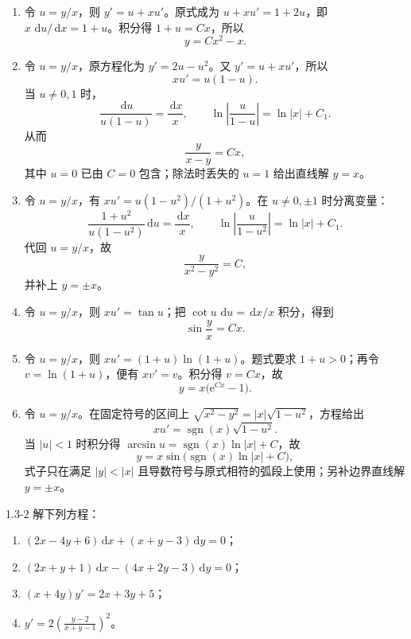 \documentclass[UTF8,a4paper,11pt]{ctexart}
\newcommand{\dd}{\,\mathrm d}
\newcommand{\e}{\mathrm e}
\begin{document}
\begin{solution}
\begin{enumerate}[label=(\arabic*)]
\item 令 $u=y/x$，则 $y'=u+xu'$。原式成为 $u+xu'=1+2u$，即
$x\,\dd u/\dd x=1+u$。积分得 $1+u=Cx$，所以
\[
\boxed{y=Cx^2-x}.
\]
\item 令 $u=y/x$，原方程化为 $y'=2u-u^2$。又 $y'=u+xu'$，所以
\[
xu'=u(1-u).
\]
当 $u\ne0,1$ 时，
\[
\frac{\dd u}{u(1-u)}=\frac{\dd x}{x},
\qquad
\ln\left|\frac{u}{1-u}\right|=\ln|x|+C_1.
\]
从而
\[
\boxed{\frac{y}{x-y}=Cx},
\]
其中 $u=0$ 已由 $C=0$ 包含；除法时丢失的 $u=1$ 给出直线解 $\boxed{y=x}$。
\item 令 $u=y/x$，有 $xu'=u(1-u^2)/(1+u^2)$。在 $u\ne0,\pm1$ 时分离变量：
\[
\frac{1+u^2}{u(1-u^2)}\dd u=\frac{\dd x}{x},
\qquad
\ln\left|\frac{u}{1-u^2}\right|=\ln|x|+C_1.
\]
代回 $u=y/x$，故
\[
\boxed{\frac{y}{x^2-y^2}=C},
\]
并补上 $\boxed{y=\pm x}$。
\item 令 $u=y/x$，则 $xu'=\tan u$；把 $\cot u\,\dd u=\dd x/x$ 积分，得到
\[
\boxed{\sin\frac yx=Cx}.
\]
\item 令 $u=y/x$，则 $xu'=(1+u)\ln(1+u)$。题式要求 $1+u>0$；再令
$v=\ln(1+u)$，便有 $xv'=v$。积分得 $v=Cx$，故
\[
\boxed{y=x\bigl(\e^{Cx}-1\bigr)}.
\]
\item 令 $u=y/x$。在固定符号的区间上 $\sqrt{x^2-y^2}=|x|\sqrt{1-u^2}$，方程给出
\[
xu'=\operatorname{sgn}(x)\sqrt{1-u^2}.
\]
当 $|u|<1$ 时积分得 $\arcsin u=\operatorname{sgn}(x)\ln|x|+C$，故
\[
\boxed{y=x\sin\!\bigl(\operatorname{sgn}(x)\ln|x|+C\bigr)},
\]
式子只在满足 $|y|<|x|$ 且导数符号与原式相符的弧段上使用；另补边界直线解 $\boxed{y=\pm x}$。
\end{enumerate}
\end{solution}

\begin{problem}{1.3-2}
解下列方程：
  \begin{enumerate}[label=(\arabic*)]
    \item $\displaystyle (2x-4y+6)\dd x+(x+y-3)\dd y=0$；
    \item $\displaystyle (2x+y+1)\dd x-(4x+2y-3)\dd y=0$；
    \item $\displaystyle (x+4y)y'=2x+3y+5$；
    \item $\displaystyle y'=2\left(\frac{y-2}{x+y-1}\right)^2$。
  \end{enumerate}
\end{problem}
\end{document}
